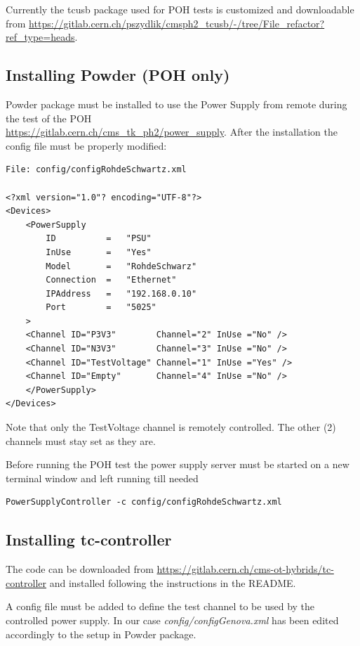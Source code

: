 \documentclass[10pt,a4paper]{article}
\begin{document}
Currently the tcusb package used for POH tests is customized and downloadable from \url{https://gitlab.cern.ch/pszydlik/cmsph2_tcusb/-/tree/File_refactor?ref_type=heads}.

\subsection{Installing Powder (POH only)}
Powder package must be installed to use the Power Supply from remote during the test of the POH \\
\url{https://gitlab.cern.ch/cms_tk_ph2/power_supply}.
After the installation the config file must be properly modified:
\begin{framed}
\begin{verbatim}
File: config/configRohdeSchwartz.xml

<?xml version="1.0"? encoding="UTF-8"?>
<Devices>
    <PowerSupply
        ID          =   "PSU"
        InUse       =   "Yes"
        Model       =   "RohdeSchwarz"
        Connection  =   "Ethernet"
        IPAddress   =   "192.168.0.10"
        Port        =   "5025"
    >
    <Channel ID="P3V3"        Channel="2" InUse ="No" />
    <Channel ID="N3V3"        Channel="3" InUse ="No" />
    <Channel ID="TestVoltage" Channel="1" InUse ="Yes" />
    <Channel ID="Empty"       Channel="4" InUse ="No" />
    </PowerSupply>
</Devices>
\end{verbatim}
\end{framed}
Note that only the TestVoltage channel is remotely controlled. The other (2) channels must stay set as they are.

\par Before running the POH test the power supply server must be started on a new terminal window and left running till needed
\begin{framed}
\begin{verbatim}
PowerSupplyController -c config/configRohdeSchwartz.xml
\end{verbatim}
\end{framed}

\subsection{Installing tc-controller}
The code can be downloaded from \url{https://gitlab.cern.ch/cms-ot-hybrids/tc-controller} and installed following the instructions in the README.
\par A config file must be added to define the test channel to be used by the controlled power supply.
In our case {\it config/configGenova.xml} has been edited accordingly to the setup in Powder package.
\end{document}
